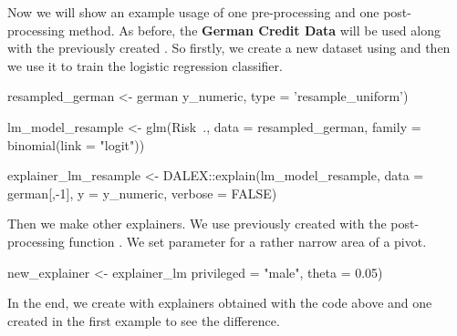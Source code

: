 Now we will show an example usage of one pre-processing and one
post-processing method. As before, the \textbf{German Credit Data} will
be used along with the previously created . So
firstly, we create a new dataset using  and
then we use it to train the logistic regression classifier.

\begin{example}
resampled_german   <- german %
                y_numeric, type = 'resample_uniform')

lm_model_resample  <- glm(Risk~.,
                data   = resampled_german,
                family = binomial(link = "logit"))

explainer_lm_resample <- DALEX::explain(lm_model_resample,
                data = german[,-1], y = y_numeric, verbose = FALSE)
\end{example}

Then we make other explainers. We use previously created
 with the post-processing function
. We set parameter  for a
rather narrow area of a pivot.

\begin{example}
new_explainer <- explainer_lm %
                privileged = "male", theta = 0.05)
\end{example}

In the end, we create  with explainers obtained
with the code above and one created in the first example to see the
difference.

